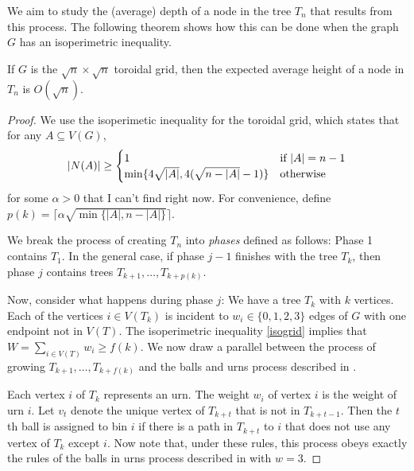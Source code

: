 \documentclass[lotsofwhite]{patmorin}
\begin{document}
We aim to study the (average) depth of a node in the tree $T_n$ that
results from this process.  The following theorem shows how this can
be done when the graph $G$ has an isoperimetric inequality.


\begin{thm}
   If $G$ is the $\sqrt{n}\times\sqrt{n}$ toroidal grid, then the 
   expected average height of a node in $T_n$ is $O(\sqrt{n})$.
\end{thm}

\begin{proof}
   We use the isoperimetic inequality for the toroidal grid, which states
   that for any $A\subseteq V(G)$,
  \begin{equation}
        |N(A)| \ge \begin{cases}
          1 & \text{if $|A|=n-1$} \\
          \min\{4\sqrt{|A|}, 4(\sqrt{n-|A|}-1)\} & \text{otherwise}
        \end{cases} 
     \eqlabel{isogrid}
  \end{equation}
  for some $\alpha >0$ that I can't find right now.  For convenience,
  define $p(k) = \lceil \alpha\sqrt{\min\{|A|, n-|A|\}}\rceil$.  


  We break the process of creating $T_n$ into \emph{phases} defined
  as follows: Phase 1 contains $T_1$.  In the general case, if phase
  $j-1$ finishes with the tree $T_k$, then phase $j$ contains trees
  $T_{k+1},\ldots,T_{k+p(k)}$.

  Now, consider what happens during phase $j$: We have a tree $T_k$
  with $k$ vertices. Each of the vertices $i\in V(T_k)$ is incident
  to $w_i\in\{0,1,2,3\}$ edges of $G$ with one endpoint not in $V(T)$.
  The isoperimetric inequality \eqref{isogrid} implies that $W=\sum_{i\in
  V(T)} w_i \ge f(k)$.  We now draw a parallel between the process of
  growing $T_{k+1},\ldots,T_{k+f(k)}$ and the balls and urns process
  described in .

  Each vertex $i$ of $T_k$ represents an urn.  The weight $w_i$ of vertex
  $i$ is the weight of urn $i$.  Let $v_t$ denote the unique vertex of
  $T_{k+t}$ that is not in $T_{k+t-1}$.  Then the $t$th ball is assigned
  to bin $i$ if there is a path in $T_{k+t}$ to $i$ that does not use
  any vertex of $T_{k}$ except $i$.  Now note that, under these rules,
  this process obeys exactly the rules of the balls in urns process
  described in  with $w=3$.


\end{proof}
\end{document}
